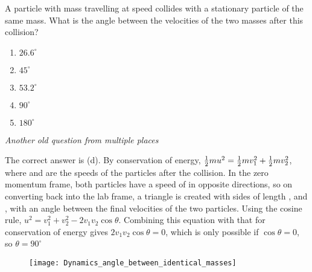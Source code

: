 
\begin{problem} 
{A particle with mass  travelling at speed   collides with a stationary particle of the same mass. What is the angle between the velocities of the two masses after this collision?
\begin{enumerate}
	\item $26.6^{\circ}$
	\item $45^{\circ}$
	\item $53.2^{\circ}$
	\item $90^{\circ}$ \answer
	\item $180^{\circ}$
\end{enumerate}
}
{\textit{Another old question from multiple places}}
{The correct answer is (d). By conservation of energy, ${\textstyle \frac{1}{2}} mu^2 = {\textstyle \frac{1}{2}} mv_1^2 + {\textstyle \frac{1}{2}} mv_2^2$, where  and  are the speeds of the particles after the collision. In the zero momentum frame, both particles have a speed of  in opposite directions, so on converting back into the lab frame, a triangle is created with sides of length  ,   and  , with an angle \vari{\theta} between the final velocities of the two particles. Using the cosine rule, $u^2 = v_1^2 +v_2^2 - 2 v_1 v_2 \cos \theta$. Combining this equation with that for conservation of energy gives $2 v_1 v_2 \cos \theta = 0$, which is only possible if $\cos \theta = 0$, so $\theta = 90^{\circ}$

\begin{figure}[h]
	\centering
	\texttt{[image: Dynamics\_angle\_between\_identical\_masses]}
	\caption{}
	\label{fig:Dynamics_angle_between_identical_masses}
\end{figure}


}
\end{problem}